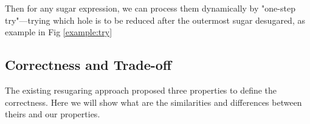 Then for any sugar expression, we can process them dynamically by "one-step try"---trying which hole is to be reduced after the outermost sugar desugared, as example in Fig \ref{example:try}



\subsection{Correctness and Trade-off}
The existing resugaring approach proposed three properties to define the correctness. Here we will show what are the similarities and differences between theirs and our properties.

